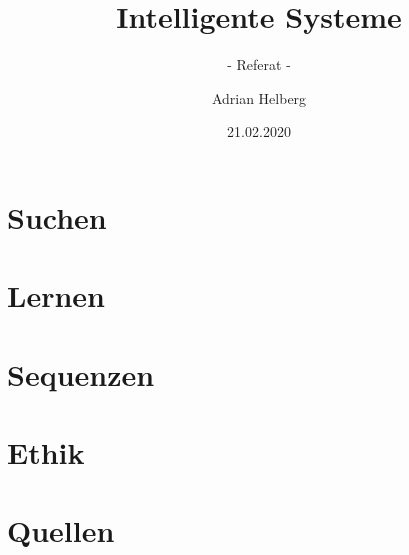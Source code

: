 \documentclass{beamer}
\title{\Huge{Intelligente Systeme}}
\subtitle{\Large - Referat -}
\author{Adrian Helberg}
\institute{HAW Hamburg}
\date{21.02.2020}
\begin{document}
    \frame{\titlepage}


    \section{Suchen}

    \section{Lernen}

    \section{Sequenzen}

    \section{Ethik}

    \section{Quellen}
\end{document}
